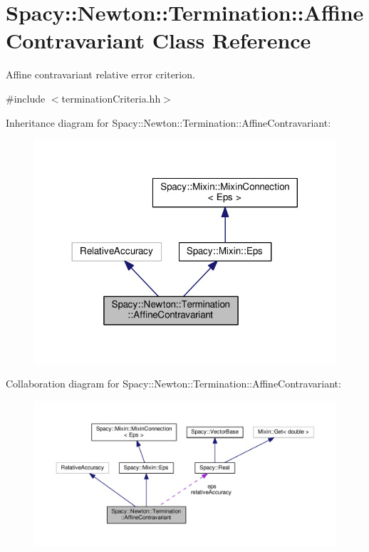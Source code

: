 \hypertarget{classSpacy_1_1Newton_1_1Termination_1_1AffineContravariant}{\section{Spacy\-:\-:Newton\-:\-:Termination\-:\-:Affine\-Contravariant Class Reference}
\label{classSpacy_1_1Newton_1_1Termination_1_1AffineContravariant}
}


Affine contravariant relative error criterion.  




{\ttfamily \#include $<$termination\-Criteria.\-hh$>$}



Inheritance diagram for Spacy\-:\-:Newton\-:\-:Termination\-:\-:Affine\-Contravariant\-:
\nopagebreak
\begin{figure}[H]
\begin{center}
\leavevmode
\includegraphics[width=317pt]{classSpacy_1_1Newton_1_1Termination_1_1AffineContravariant__inherit__graph}
\end{center}
\end{figure}


Collaboration diagram for Spacy\-:\-:Newton\-:\-:Termination\-:\-:Affine\-Contravariant\-:
\nopagebreak
\begin{figure}[H]
\begin{center}
\leavevmode
\includegraphics[width=350pt]{classSpacy_1_1Newton_1_1Termination_1_1AffineContravariant__coll__graph}
\end{center}
\end{figure}
